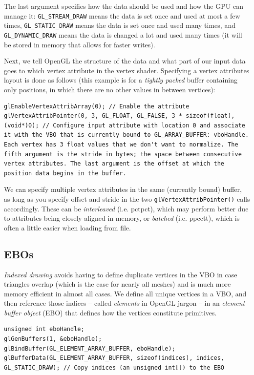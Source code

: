 \documentclass[table, xcdraw]{article}%
\begin{document}
The last argument specifies how the data should be used and how the GPU can manage it: \texttt{GL_STREAM_DRAW} means the data is set once and used at most a few times, \texttt{GL_STATIC_DRAW} means the data is set once and used many times, and \texttt{GL_DYNAMIC_DRAW} means the data is changed a lot and used many times (it will be stored in memory that allows for faster writes).

Next, we tell OpenGL the structure of the data and what part of our input data goes to which vertex attribute in the vertex shader. Specifying a vertex attributes layout is done as follows (this example is for a \emph{tightly packed} buffer containing only positions, in which there are no other values in between vertices):

\begin{verbatim}
glEnableVertexAttribArray(0); // Enable the attribute
glVertexAttribPointer(0, 3, GL_FLOAT, GL_FALSE, 3 * sizeof(float), (void*)0); // Configure input attribute with location 0 and associate it with the VBO that is currently bound to GL_ARRAY_BUFFER: vboHandle. Each vertex has 3 float values that we don't want to normalize. The fifth argument is the stride in bytes; the space between consecutive vertex attributes. The last argument is the offset at which the position data begins in the buffer.
\end{verbatim}

We can specify multiple vertex attributes in the same (currently bound) buffer, as long as you specify offset and stride in the two \texttt{glVertexAttribPointer()} calls accordingly. These can be \emph{interleaved} (i.e. pctpct), which may perform better due to attributes being closely aligned in memory, or \emph{batched} (i.e. ppcctt), which is often a little easier when loading from file.

\subsection{EBOs}

\emph{Indexed drawing} avoids having to define duplicate vertices in the VBO in case triangles overlap (which is the case for nearly all meshes) and is much more memory efficient in almost all cases. We define all unique vertices in a VBO, and then reference those indices -- called \emph{elements} in OpenGL jargon -- in an \emph{element buffer object} (EBO) that defines how the vertices constitute primitives.

\begin{verbatim}
unsigned int eboHandle;
glGenBuffers(1, &eboHandle);
glBindBuffer(GL_ELEMENT_ARRAY_BUFFER, eboHandle);
glBufferData(GL_ELEMENT_ARRAY_BUFFER, sizeof(indices), indices, GL_STATIC_DRAW); // Copy indices (an unsigned int[]) to the EBO
\end{verbatim}
\end{document}

